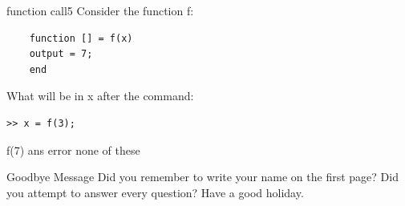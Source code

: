 \documentclass{exam}
\begin{document}
\begin{problem}{function call}{5}
  Consider the function f:
  \begin{verbatim}
    function [] = f(x)
    output = 7;
    end
  \end{verbatim}
  What will be in x after the command:
  \begin{verbatim}>> x = f(3);\end{verbatim}
  \begin{answers}
    \answer f(7)
    \answer ans
     error %
    \answer[fixed] none of these %
  \end{answers}
\end{problem}

\begin{block}{Goodbye Message}
  Did you remember to write your name on the first page?  Did you
  attempt to answer every question?    Have a good holiday.
\end{block}
\end{document}
